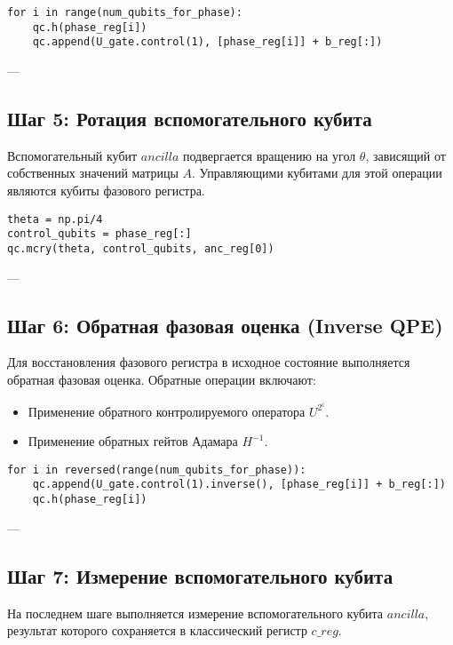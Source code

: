 \begin{verbatim}
for i in range(num_qubits_for_phase):
    qc.h(phase_reg[i])
    qc.append(U_gate.control(1), [phase_reg[i]] + b_reg[:])
\end{verbatim}

---

\subsection*{Шаг 5: Ротация вспомогательного кубита}

Вспомогательный кубит \( ancilla \) подвергается вращению на угол \( \theta \), зависящий от собственных значений матрицы \( A \). Управляющими кубитами для этой операции являются кубиты фазового регистра.

\begin{verbatim}
theta = np.pi/4
control_qubits = phase_reg[:]
qc.mcry(theta, control_qubits, anc_reg[0]) 
\end{verbatim}

---

\subsection*{Шаг 6: Обратная фазовая оценка (Inverse QPE)}

Для восстановления фазового регистра в исходное состояние выполняется обратная фазовая оценка. Обратные операции включают:
\begin{itemize}
    \item Применение обратного контролируемого оператора \( U^{2^i} \).
    \item Применение обратных гейтов Адамара \( H^{-1} \).
\end{itemize}

\begin{verbatim}
for i in reversed(range(num_qubits_for_phase)):
    qc.append(U_gate.control(1).inverse(), [phase_reg[i]] + b_reg[:])
    qc.h(phase_reg[i])
\end{verbatim}

---

\subsection*{Шаг 7: Измерение вспомогательного кубита}

На последнем шаге выполняется измерение вспомогательного кубита \( ancilla \), результат которого сохраняется в классический регистр \( c\_reg \).

